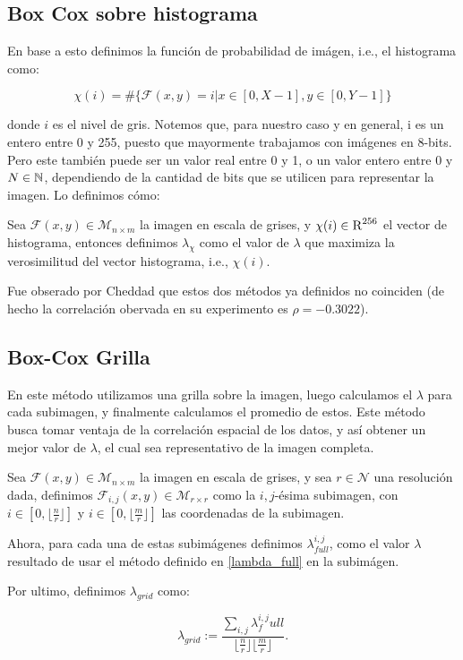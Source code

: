     \subsection{Box Cox sobre histograma}

    En base a esto definimos la funci\'on de probabilidad de im\'agen, i.e., el histograma como:
    
    $$\chi(i)= \# \{\mathcal{F}(x,y)=i | x\in[0,X-1], y\in[0,Y-1] \}$$ 

    donde $i$ es el nivel de gris. Notemos que, para nuestro caso y en general, i es un entero entre 0 y 255, puesto que mayormente trabajamos con im\'agenes en 8-bits. Pero este tambi\'en puede ser un valor real entre 0 y 1, o un valor entero entre 0 y $N\in\mathbb{N}$, dependiendo de la cantidad de bits que se utilicen para representar la imagen. Lo definimos cómo:

    \begin{defn}\label{lambda_hist}
        Sea $\mathcal{F}(x, y)\in\mathcal{M}_{n\times m}$ la imagen en escala de grises, y $\chi(i)\in\textsc{R}^{256}$ el vector de histograma, entonces definimos $\lambda_{\chi}$ como el valor de $\lambda$ que maximiza la verosimilitud del vector histograma, i.e., $\chi(i)$.
    \end{defn}
    
    Fue obserado por Cheddad que estos dos m\'etodos ya definidos no coinciden (de hecho la correlaci\'on obervada en su experimento es $\rho=-0.3022$).

    \subsection{Box-Cox Grilla}

    En este m\'etodo utilizamos una grilla sobre la imagen, luego calculamos el $\lambda$ para cada subimagen, y finalmente calculamos el promedio de estos. Este m\'etodo busca tomar ventaja de la correlaci\'on espacial de los datos, y as\'i obtener un mejor valor de $\lambda$, el cual sea representativo de la imagen completa.

    
    \begin{defn}\label{lambda_grid}
        Sea $\mathcal{F}(x, y)\in\mathcal{M}_{n\times m}$ la imagen en escala de grises, y sea $r \in \mathcal{N} $ una resoluci\'on dada, definimos $\mathcal{F}_{i,j}(x, y)\in\mathcal{M}_{r\times r}$ como la $i,j$-ésima subimagen, con $i\in[0,\lfloor\frac{n}{r}\rfloor]$ y $i\in[0,\lfloor\frac{m}{r}\rfloor]$ las coordenadas de la subimagen.
        
        Ahora, para cada una de estas subim\'agenes definimos $\lambda^{i,j}_{full}$, como el valor $\lambda$ resultado de usar el m\'etodo definido en \ref{lambda_full} en la subim\'agen.

        Por ultimo, definimos $\lambda_{grid}$ como:
        
        $$
        \lambda_{grid} := \frac{\sum_{i,j} \lambda^{i,j}_full}{\lfloor\frac{n}{r}\rfloor\lfloor\frac{m}{r}\rfloor}.
        $$
    \end{defn}
    

